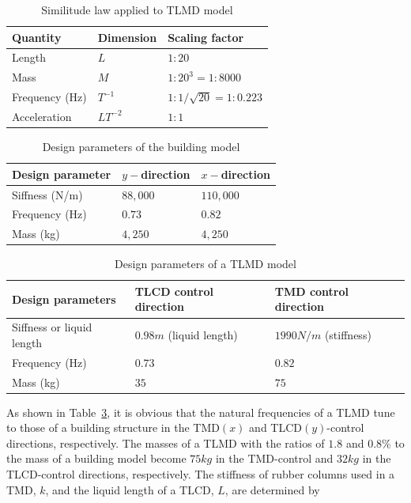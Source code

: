 \begin{table}[ht]
\centering
\begin{tabularx}{\textwidth}{@{}X|X|X@{}}
\toprule[1pt]\midrule[0.3pt]
Quantity & Dimension & Scaling factor\\ \hline
Length & $L$ & $1:20$\\
Mass & $M$ & $1:20^{3} = 1:8000$\\
Frequency (Hz) & $T^{-1}$ & $1:1/\sqrt{20} = 1:0.223$\\
Acceleration & $LT^{-2}$ & $1:1$\\
\bottomrule
\end{tabularx}
\caption{Similitude law applied to TLMD model}
\label{tab:5-1}
\end{table}

\begin{table}[ht]
\centering
\begin{tabularx}{\textwidth}{@{}X|X|X@{}}
\toprule[1pt]\midrule[0.3pt]
Design parameter & $y-$direction & $x-$direction\\ \hline
Siffness (N/m) & $88,000$ & $110,000$\\
Frequency (Hz) & $0.73$ & $0.82$\\
Mass (kg) & $4,250$ & $4,250$\\
\bottomrule
\end{tabularx}
\caption{Design parameters of the building model}
\label{tab:5-2}
\end{table}

\begin{table}[ht]
\centering
\begin{tabularx}{\textwidth}{@{}X|X|X@{}}
\toprule[1pt]\midrule[0.3pt]
Design parameters & TLCD control direction & TMD control direction\\ \hline
Siffness or liquid length & $0.98m$ (liquid length) & $1990N/m$ (stiffness)\\
Frequency (Hz) & $0.73$ & $0.82$\\
Mass (kg) & $35$ & $75$\\
\bottomrule
\end{tabularx}
\caption{Design parameters of a TLMD model}
\label{tab:5-3}
\end{table}

As shown in Table~\ref{tab:5-3}, it is obvious that the natural frequencies of a TLMD tune to those of a building structure in the TMD$(x)$ and TLCD$(y)$-control directions, respectively. The masses of a TLMD with the ratios of $1.8$ and $0.8\%$ to the mass of a building model become $75kg$ in the TMD-control and $32kg$ in the TLCD-control directions, respectively. The stiffness of rubber columns used in a TMD, $k$, and the liquid length of a TLCD, $L$, are determined by

